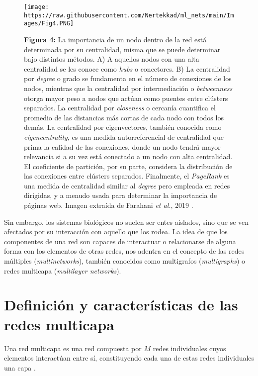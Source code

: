 \documentclass[
]{book}
\begin{document}
\begin{figure}
\centering
\texttt{[image: https://raw.githubusercontent.com/Nertekkad/ml\_nets/main/Images/Fig4.PNG]}
\caption{\textbf{Figura 4:} La importancia de un nodo dentro de la red está determinada por su centralidad, misma que se puede determinar bajo distintos métodos. A) A aquellos nodos con una alta centralidad se les conoce como \emph{hubs} o conectores. B) La centralidad por \emph{degree} o grado se fundamenta en el número de conexiones de los nodos, mientras que la centralidad por intermediación o \emph{betweenness} otorga mayor peso a nodos que actúan como puentes entre clústers separados. La centralidad por \emph{closeness} o cercanía cuantifica el promedio de las distancias más cortas de cada nodo con todos los demás. La centralidad por eigenvectores, también conocida como \emph{eigencentrality}, es una medida autorreferencial de centralidad que prima la calidad de las conexiones, donde un nodo tendrá mayor relevancia si a su vez está conectado a un nodo con alta centralidad. El coeficiente de partición, por su parte, considera la distribución de las conexiones entre clústers separados. Finalmente, el \emph{PageRank} es una medida de centralidad similar al \emph{degree} pero empleada en redes dirigidas, y a menudo usada para determinar la importancia de páginas web. Imagen extraída de Farahani \emph{et al.}, 2019 \citep{farahani2019application}.}
\end{figure}

Sin embargo, los sistemas biológicos no suelen ser entes aislados, sino que se ven afectados por su interacción con aquello que los rodea. La idea de que los componentes de una red son capaces de interactuar o relacionarse de alguna forma con los elementos de otras redes, nos adentra en el concepto de las redes múltiples (\emph{multinetworks}), también conocidos como multigrafos (\emph{multigraphs}) o redes multicapa (\emph{multilayer networks}).

\hypertarget{definiciuxf3n-y-caracteruxedsticas-de-las-redes-multicapa}{%
\section*{Definición y características de las redes multicapa}\label{definiciuxf3n-y-caracteruxedsticas-de-las-redes-multicapa}}

Una red multicapa es una red compuesta por \(M\) redes individuales cuyos elementos interactúan entre sí, constituyendo cada una de estas redes individuales una capa \citep{buldyrev2010catastrophic}.
\end{document}

